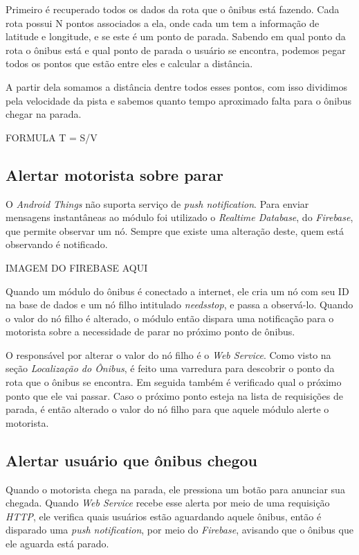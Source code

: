 \documentclass[
	12pt,				%
	oneside,			%
	a4paper,			%
	brazil				%
]{abntex2}
\begin{document}
Primeiro é recuperado todos os dados da rota que o ônibus está fazendo. Cada rota possui N pontos associados a ela, onde cada um tem a informação de latitude e longitude, e se este é um ponto de parada. Sabendo em qual ponto da rota o ônibus está e qual ponto de parada o usuário se encontra, podemos pegar todos os pontos que estão entre eles e calcular a distância. 

A partir dela somamos a distância dentre todos esses pontos, com isso dividimos pela velocidade da pista e sabemos quanto tempo aproximado falta para o ônibus chegar na parada.

FORMULA T = S/V


\subsection{Alertar motorista sobre parar}

O \textit{Android Things} não suporta serviço de \textit{push notification}. Para enviar mensagens instantâneas ao módulo foi utilizado o \textit{Realtime Database}, do \textit{Firebase}, que permite observar um nó. Sempre que existe uma alteração deste, quem está observando é notificado.

IMAGEM DO FIREBASE AQUI

Quando um módulo do ônibus é conectado a internet, ele cria um nó com seu ID na base de dados e um nó filho intitulado \textit{needsstop}, e passa a observá-lo. Quando o valor do nó filho é alterado, o módulo então dispara uma notificação para o motorista sobre a necessidade de parar no próximo ponto de ônibus.

O responsável por alterar o valor do nó filho é o \textit{Web Service}. Como visto na seção \textit{Localização do Ônibus}, é feito uma varredura para descobrir o ponto da rota que o ônibus se encontra. Em seguida também é verificado qual o próximo ponto que ele vai passar. Caso o próximo ponto esteja na lista de requisições de parada, é então alterado o valor do nó filho para que aquele módulo alerte o motorista.

\subsection{Alertar usuário que ônibus chegou}

Quando o motorista chega na parada, ele pressiona um botão para anunciar sua chegada. Quando \textit{Web Service} recebe esse alerta por meio de uma requisição \textit{HTTP}, ele verifica quais usuários estão aguardando aquele ônibus, então é disparado uma \textit{push notification}, por meio do \textit{Firebase}, avisando que o ônibus que ele aguarda está parado.
\end{document}
